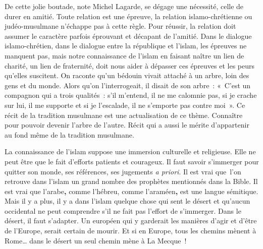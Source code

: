 De cette jolie boutade, note Michel Lagarde, se dégage une nécessité,
celle de durer en amitié. Toute relation est une épreuve, la relation
islamo-chrétienne ou judéo-musulmane n'échappe pas à cette règle. Pour
réussir, la relation doit assumer le caractère parfois éprouvant et
décapant de l'amitié. Dans le dialogue islamo-chrétien, dans le dialogue
entre la république et l'islam, les épreuves ne manquent pas, mais notre
connaissance de l'islam en faisant naître un lien de charité, un lien de
fraternité, doit nous aider à dépasser ces épreuves et les peurs
qu'elles suscitent. On raconte qu'un bédouin vivait attaché à un arbre,
loin des gens et du monde. Alors qu'on l'interrogeait, il disait de son
arbre~: «~C'est un compagnon qui a trois qualités~: s'il m'entend, il ne
me calomnie pas, si je crache sur lui, il me supporte et si je
l'escalade, il ne s'emporte pas contre moi~». Ce récit de la tradition musulmane est
une actualisation de ce thème. Connaître pour pouvoir devenir l'arbre de
l'autre. Récit qui a aussi le mérite d'appartenir au fond même de la
tradition musulmane.


La connaissance de l'islam suppose une immersion culturelle et
religieuse. Elle ne peut être que le fait d'efforts patients et
courageux. Il faut savoir s'immerger pour quitter son monde, ses
références, ses jugements \emph{a priori}. Il est vrai que~l'on retrouve
dans l'islam un grand nombre des prophètes mentionnés dans la Bible. Il
est vrai que l'arabe\textbf{,} comme l'hébreu, comme l'araméen\textbf{,}
est une langue sémitique. Mais il y a plus, il y a dans l'islam quelque
chose qui sent le désert et qu'aucun occidental ne peut comprendre s'il
ne fait pas l'effort de s'immerger. Dans le désert, il faut s'adapter.
Un européen qui y garderait les manières d'agir et d'être de l'Europe,
serait certain de mourir. Et si en Europe, tous les chemins mènent à
Rome\ldots{} dans le désert un seul chemin mène à La Mecque~!

